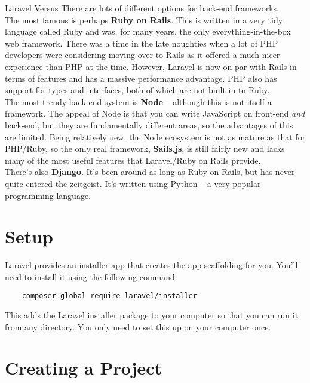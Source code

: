 \begin{infobox}{Laravel Versus\textellipsis}
    There are lots of different options for back-end frameworks.
    \\

    The most famous is perhaps \textbf{Ruby on Rails}. This is written in a very tidy language called Ruby and was, for many years, the only everything-in-the-box web framework. There was a time in the late noughties when a lot of PHP developers were considering moving over to Rails as it offered a much nicer experience than PHP at the time. However, Laravel is now on-par with Rails in terms of features and has a massive performance advantage. PHP also has support for types and interfaces, both of which are not built-in to Ruby.
    \\

    The most trendy back-end system is \textbf{Node} – although this is not itself a framework. The appeal of Node is that you can write JavaScript on front-end \textit{and} back-end, but they are fundamentally different areas, so the advantages of this are limited. Being relatively new, the Node ecosystem is not as mature as that for PHP/Ruby, so the only real framework, \textbf{Sails.js}, is still fairly new and lacks many of the most useful features that Laravel/Ruby on Rails provide.
    \\

    There's also \textbf{Django}. It's been around as long as Ruby on Rails, but has never quite entered the zeitgeist. It's written using Python – a very popular programming language.
\end{infobox}

\pagebreak


\section{Setup}

Laravel provides an installer app that creates the app scaffolding for you. You'll need to install it using the following command:

\begin{verbatim}
    composer global require laravel/installer
\end{verbatim}

This adds the Laravel installer package to your computer so that you can run it from any directory. You only need to set this up on your computer once.


\section{Creating a Project}


